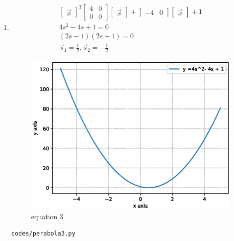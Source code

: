 \begin{enumerate}[label=\arabic*.,ref=\thesubsection.\theenumi]
\item
\begin{align}
\begin{bmatrix}\vec x\end{bmatrix}^T\begin{bmatrix}4 & 0\\0 & 0\end{bmatrix}\begin{bmatrix}\vec x\end{bmatrix} + \begin{bmatrix}-4 & 0\end{bmatrix}\begin{bmatrix}\vec x\end{bmatrix} +1
\\
4s^2-4s+1 = 0
\\
\left(2s-1\right)\left(2s + 1\right) = 0
\\
\vec s_1 = \frac{1}{2} ,\vec s_2 =-\frac{1}{2} 
\end{align}
\begin{figure}[!ht]
	\centering
	\includegraphics[width=\columnwidth]{./figures/perabola3.eps}
	\caption{equation 3 }
	\label{fig:perabola3}
\end{figure}
\begin{lstlisting}
codes/perabola3.py
\end{lstlisting}



\end{enumerate}
